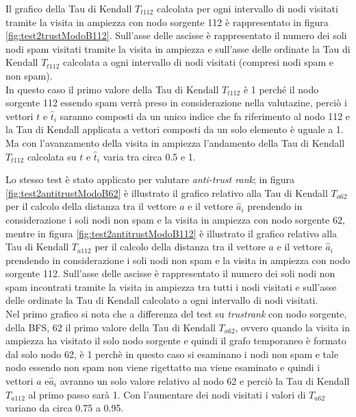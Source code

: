 Il grafico della Tau di Kendall \(T_{t112}\)  calcolata  per ogni intervallo di nodi visitati tramite la visita in ampiezza con nodo sorgente 112 è rappresentato in figura \ref{fig:test2trustModoB112}.  Sull'asse delle ascisse è rappresentato il numero dei soli nodi spam visitati tramite la visita in ampiezza e sull'asse delle ordinate la Tau di Kendall \(T_{t112}\) calcolata a ogni intervallo di nodi visitati (compresi nodi spam e non spam).\\
In questo caso il primo valore della Tau di Kendall \(T_{t112}\) è 1 perché  il nodo sorgente 112 essendo spam verrà preso in considerazione nella valutazine, perciò i vettori \(t\) e \(\hat{t}_i\) saranno composti da un unico indice che fa riferimento al nodo 112 e la Tau di Kendall applicata a vettori composti da un solo elemento è uguale a 1. Ma con l'avanzamento della visita in ampiezza l'andamento della Tau di Kendall \(T_{t112}\) calcolata su \(t\) e \(\hat{t}_i\) varia tra circa 0.5 e 1.

Lo stesso test è stato applicato per valutare \textit{anti-trust rank}; in figura \ref{fig:test2antitrustModoB62} è illustrato il grafico relativo alla Tau di Kendall \(T_{a62}\) per il calcolo della distanza tra il vettore \(a\) e il vettore \(\hat{a}_i\) prendendo in considerazione i soli nodi non spam e la visita in ampiezza con nodo sorgente 62, mentre in figura \ref{fig:test2antitrustModoB112} è illustrato il grafico relativo alla Tau di Kendall \(T_{a112}\) per il calcolo della distanza tra il vettore \(a\) e il vettore \(\hat{a}_i\) prendendo in considerazione i soli nodi non spam e la visita in ampiezza con nodo sorgente 112. Sull'asse delle ascisse è rappresentato il numero dei soli nodi non spam incontrati tramite la visita in ampiezza tra tutti i nodi visitati e sull'asse delle ordinate la Tau di Kendall calcolato a ogni intervallo di nodi visitati.\\
Nel primo grafico si nota che a differenza del test su \textit{trustrank} con nodo sorgente, della BFS, 62 il primo valore della Tau di Kendall \(T_{a62}\), ovvero quando la visita in ampiezza ha visitato il solo nodo sorgente e quindi il grafo temporaneo è formato dal solo nodo 62, è 1 perchè in questo caso si esaminano i nodi non spam e tale nodo essendo non spam non viene rigettatto ma viene esaminato e quindi i vettori \(a\) e\(\hat{a}_i\) avranno un solo valore relativo al nodo 62 e perciò la Tau di Kendall \(T_{a112}\) al primo passo sarà 1. Con l'aumentare dei nodi visitati i valori di \(T_{a62}\) variano da circa 0.75 a 0.95.

